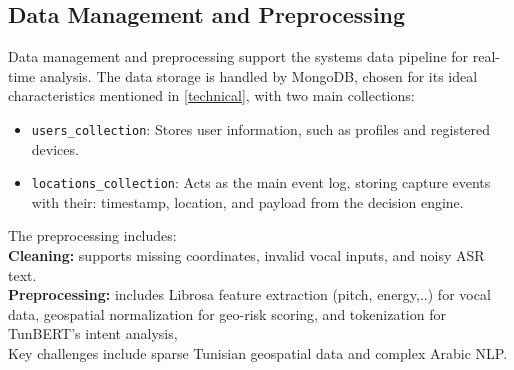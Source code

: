 \documentclass[12pt,a4paper,oneside,english]{book}
\begin{document}
{\subsection{Data Management and Preprocessing}
\label{sec:data_management}
Data management and preprocessing support the systems data pipeline for real-time analysis.
The data storage is handled by MongoDB, chosen for its ideal characteristics mentioned in \ref{technical}, with two main collections:
\begin{itemize}
    \item \texttt{users\_collection}: Stores user information, such as profiles and registered devices.
    \item \texttt{locations\_collection}: Acts as the main event log, storing capture events with their: timestamp, location, and payload from the decision engine.
\end{itemize}

The preprocessing includes: \\
\textbf{Cleaning:} supports missing coordinates, invalid vocal inputs, and noisy ASR text.\\
\textbf{Preprocessing:} includes Librosa feature extraction (pitch, energy,..) for vocal data, geospatial normalization for geo-risk scoring, and tokenization for TunBERT's intent analysis, 
\\  Key challenges include sparse Tunisian geospatial data and complex Arabic NLP.



}
\end{document}
